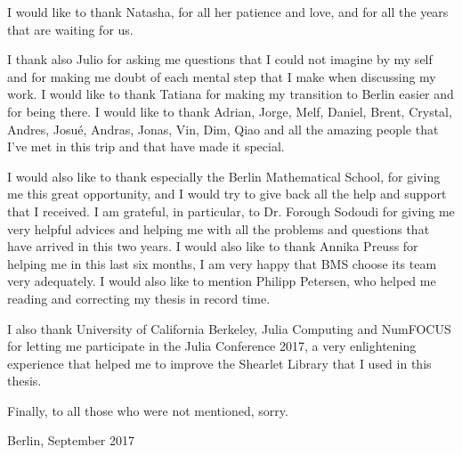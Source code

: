 \documentclass[11pt, english, singlespacing, headsepline, ]{MastersDoctoralThesis}
\theoremstyle{definition}
\begin{document}
\bigskip

I would like to thank Natasha, for all her patience and love, and for all the years that are waiting for us. 

\bigskip

I thank also Julio for asking me questions that I could not imagine by my self and for making me doubt of each mental step that I make when discussing my work. I would like to thank Tatiana for making my transition to Berlin easier and for being there. I would like to thank Adrian, Jorge, Melf, Daniel, Brent, Crystal, Andres, Josu\'e, Andras, Jonas, Vin, Dim, Qiao and all the amazing people that I've met in this trip and that have made it special.

\bigskip

I would also like to thank especially the Berlin Mathematical School, for giving me this great opportunity, and I would try to give back all the help and support that I received. I am grateful, in particular, to Dr. Forough Sodoudi for giving me very helpful advices and helping me with all the problems and questions that have arrived in this two years. I would also like to thank Annika Preuss for helping me in this last six months, I am very happy that BMS choose its team very adequately. I would also like to mention Philipp Petersen, who helped me reading and correcting my thesis in record time. 

\bigskip

I also thank University of California Berkeley, Julia Computing and NumFOCUS for letting me participate in the Julia Conference 2017, a very enlightening experience that helped me to improve the Shearlet Library that I used in this thesis.

\bigskip

Finally, to all those who were not mentioned, sorry.

\bigskip


Berlin, September 2017 



\pagestyle{empty} 
\tableofcontents%




\end{document}
